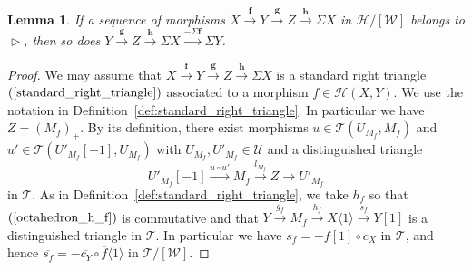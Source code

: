 \documentclass[a4paper,reqno,10pt]{amsart}
\newtheorem{lemma}[lemma]{Lemma}
\theoremstyle{definition}
\theoremstyle{definition}
\theoremstyle{definition}
\theoremstyle{definition}
\theoremstyle{plain}
\newcommand{\CH}{\mathcal{H}}
\newcommand{\CT}{\mathcal{T}}
\newcommand{\CU}{\mathcal{U}}
\newcommand{\CW}{\mathcal{W}}
\begin{document}
\begin{lemma}\label{lem:RTR2}
If a sequence of morphisms
$
X\xrightarrow{\mathbf{f}}Y\xrightarrow{\mathbf{g}}Z\xrightarrow{\mathbf{h}}\Sigma X
$
in $\CH/[\CW]$ belongs to $\vartriangleright$, then so does
$
Y\xrightarrow{\mathbf{g}}Z\xrightarrow{\mathbf{h}}\Sigma X\xrightarrow{-\Sigma\mathbf{f}}\Sigma Y
$.
\end{lemma}
\begin{proof}
We may assume that $X\xrightarrow{\mathbf{f}}Y\xrightarrow{\mathbf{g}}Z\xrightarrow{\mathbf{h}}\Sigma X$ is a standard right triangle $(\ref{standard_right_triangle})$ associated to a morphism $f\in\CH(X,Y)$. We use the notation in Definition~\ref{def:standard_right_triangle}. In particular we have $Z=(M_f)_+$. By its definition, there exist morphisms $u\in\CT(U_{M_f},M_f)$ and $u'\in\CT(U'_{M_f}[-1],U_{M_f})$ with $U_{M_f},U'_{M_f}\in\CU$ and a distinguished triangle
\[
U'_{M_f}[-1]\xrightarrow{u\circ u'}M_f\xrightarrow{l_{M_f}}Z\to U'_{M_f}
\]
in $\CT$.
As in Definition~\ref{def:standard_right_triangle}, we take $h_f$ so that $(\ref{octahedron_h_f})$ is commutative and that $Y\xrightarrow{g_f}M_f\xrightarrow{h_f}X\langle1\rangle\xrightarrow{s_f}Y[1]$ is a distinguished triangle in $\CT$. In particular we have $s_f=-f[1]\circ c_X$ in $\CT$, and hence $\overline{s_f}=-\overline{c_Y}\circ\overline{f}\langle1\rangle$ in $\CT/[\CW]$.


\end{proof}
\end{document}
